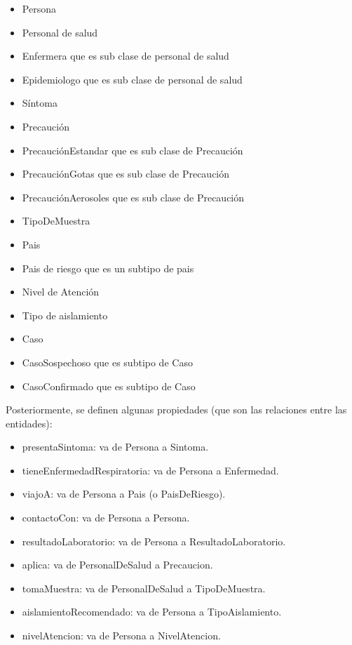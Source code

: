 \documentclass[11pt, letterpaper]{article}
\begin{document}
\begin{itemize}
	\item Persona
	\item Personal de salud
	\item Enfermera que es sub clase de personal de salud
	\item Epidemiologo que es sub clase de personal de salud
	\item Síntoma
	\item Precaución
	\item PrecauciónEstandar que es sub clase de Precaución
	\item PrecauciónGotas que es sub clase de Precaución
	\item PrecauciónAerosoles que es sub clase de Precaución
	\item TipoDeMuestra
	\item Pais
	\item Pais de riesgo que es un subtipo de pais
	\item Nivel de Atención
	\item Tipo de aislamiento
	\item Caso
	\item CasoSospechoso que es subtipo de Caso
	\item CasoConfirmado que es subtipo de Caso
	
\end{itemize}

Posteriormente, se definen algunas propiedades (que son las relaciones entre las entidades):

\begin{itemize}
	\item presentaSintoma: va de Persona a Sintoma.
	\item tieneEnfermedadRespiratoria: va de Persona a Enfermedad.
	\item viajoA: va de Persona a Pais (o PaisDeRiesgo).
	\item contactoCon: va de Persona a Persona.
	\item resultadoLaboratorio: va de Persona a ResultadoLaboratorio.
	\item aplica: va de PersonalDeSalud a Precaucion.
	\item tomaMuestra: va de PersonalDeSalud a TipoDeMuestra.
	\item aislamientoRecomendado: va de Persona a TipoAislamiento.
	\item nivelAtencion: va de Persona a NivelAtencion.
	
\end{itemize}
\end{document}
